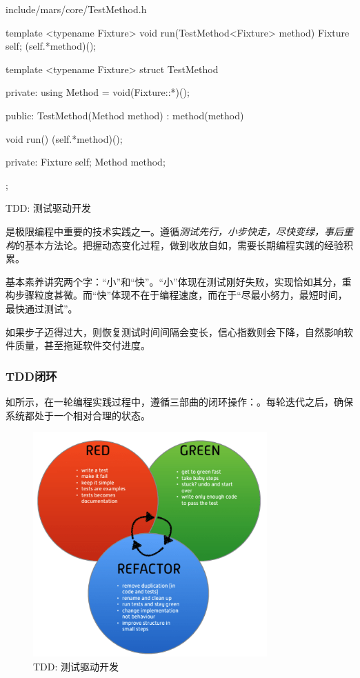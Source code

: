 \begin{content}
\begin{diff}{include/mars/core/TestMethod.h}
\begin{minicpp}
template <typename Fixture>
void run(TestMethod<Fixture> method) {
  Fixture self;
  (self.*method)();
}
\end{minicpp}
\tcblower
\begin{minicpp}
template <typename Fixture>
struct TestMethod {
private:
  using Method = void(Fixture::*)();

public:
  TestMethod(Method method)
    : method(method) {
  }

  void run() {
    (self.*method)();
  }

private:
  Fixture self;
  Method method;
};
\end{minicpp}
\end{diff}

\begin{episode}{TDD: 测试驱动开发}
\begin{content}

是极限编程中重要的技术实践之一。遵循\emph{测试先行，小步快走，尽快变绿，事后重构}的基本方法论。把握动态变化过程，做到收放自如，需要长期编程实践的经验积累。

基本素养讲究两个字：“小”和“快”。“小”体现在测试刚好失败，实现恰如其分，重构步骤粒度甚微。而“快”体现不在于编程速度，而在于“尽最小努力，最短时间，最快通过测试”。

如果步子迈得过大，则恢复测试时间间隔会变长，信心指数则会下降，自然影响软件质量，甚至拖延软件交付进度。

\subsubsection{TDD闭环}

如所示，在一轮编程实践过程中，遵循三部曲的闭环操作：。每轮迭代之后，确保系统都处于一个相对合理的状态。

\begin{figure}[H]
\centering
\includegraphics[width=0.8\textwidth]{figures/xunit/tdd-cycle.png}
\caption{TDD: 测试驱动开发}
 \label{fig:tdd-cycle}
\end{figure}


\end{content}
\end{episode}
\end{content}
